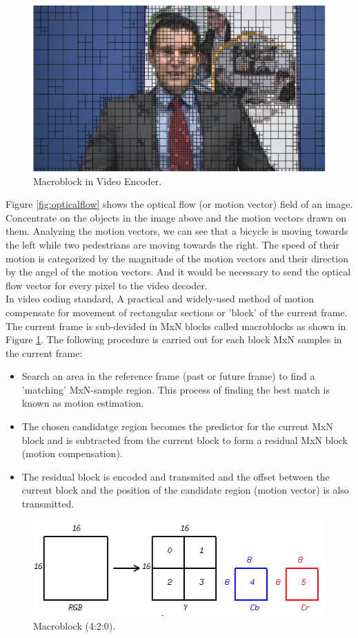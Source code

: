 \begin{figure}
\centering
 \includegraphics[width=0.8\linewidth]{Figures/macroblock.png}
 \caption{Macroblock in Video Encoder.}
 \label{fig:macroblock}
\end{figure}
Figure \ref{fig:opticalflow} shows the optical flow (or motion vector) field of an image. Concentrate on the objects in the image above and the motion vectors drawn on them. Analyzing the motion vectors, we can see that a bicycle is moving towards the left while two pedestrians are moving towards the right. The speed of their motion is categorized by the magnitude of the motion vectors and their direction by the angel of the motion vectors. And it would be necessary to send the optical flow vector for every pixel to the video decoder.\\
 In video coding standard, A practical and widely-used method of motion compensate for movement of rectangular sections or 'block' of the current frame. The current frame is sub-devided in MxN blocks called macroblocks as shown in Figure \ref{fig:macroblock}. The following procedure is carried out for each block MxN samples in the current frame:
\begin{itemize}
\item Search an area in the reference frame (past or future frame) to find a 'matching' MxN-sample region. This process of finding the best match is known as motion estimation.
\item The chosen candidatge region becomes the predictor for the current MxN block and is subtracted from the current block to form a residual MxN block (motion compensation).
\item The residual block is encoded and transmited and the offset between the current block and the position of the candidate region (motion vector) is also transmitted. 
\end{itemize}
\begin{figure}
\centering
 \includegraphics[width=0.8\linewidth]{Figures/yuv420.png}
 \caption{Macroblock (4:2:0).}
 \label{fig:yuv420}
\end{figure}
